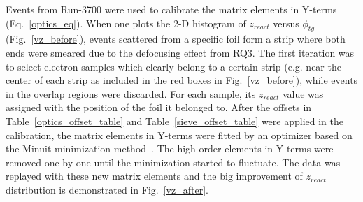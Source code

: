 Events from Run-3700 were used to calibrate the matrix elements in Y-terms (Eq.~\eqref{optics_eq}). When one plots the 2-D histogram of $z_{react}$ versus $\phi_{tg}$ (Fig.~\ref{vz_before}), events scattered from a specific foil form a strip where both ends  were smeared due to the defocusing effect from RQ3. The first iteration was to select electron samples which clearly belong to a certain strip (e.g. near the center of each strip as included in the red boxes in Fig.~\ref{vz_before}), while events in the overlap regions were discarded. For each sample, its $z_{react}$ value was assigned with the position of the foil it belonged to. After the offsets in Table~\ref{optics_offset_table} and Table~\ref{sieve_offset_table} were applied in the calibration, the matrix elements in Y-terms were fitted by an optimizer based on the Minuit minimization method~\cite{jin_huang_optics}. The high order elements in Y-terms were removed one by one until the minimization started to fluctuate. The data was replayed with these new matrix elements and the big improvement of $z_{react}$ distribution is demonstrated in Fig.~\ref{vz_after}.

